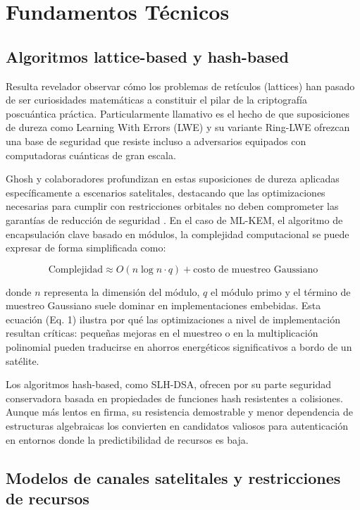 \section{Fundamentos Técnicos}

\subsection{Algoritmos lattice-based y hash-based}

Resulta revelador observar cómo los problemas de retículos (lattices) han pasado de ser curiosidades matemáticas a constituir el pilar de la criptografía poscuántica práctica. Particularmente llamativo es el hecho de que suposiciones de dureza como Learning With Errors (LWE) y su variante Ring-LWE ofrezcan una base de seguridad que resiste incluso a adversarios equipados con computadoras cuánticas de gran escala.

Ghosh y colaboradores profundizan en estas suposiciones de dureza aplicadas específicamente a escenarios satelitales, destacando que las optimizaciones necesarias para cumplir con restricciones orbitales no deben comprometer las garantías de reducción de seguridad \cite{Ghosh2026}. En el caso de ML-KEM, el algoritmo de encapsulación clave basado en módulos, la complejidad computacional se puede expresar de forma simplificada como:

\begin{equation}
\text{Complejidad} \approx O(n \log n \cdot q) + \text{costo de muestreo Gaussiano}
\label{eq:complejidad_mlkem}
\end{equation}

donde \(n\) representa la dimensión del módulo, \(q\) el módulo primo y el término de muestreo Gaussiano suele dominar en implementaciones embebidas. Esta ecuación (Eq. 1) ilustra por qué las optimizaciones a nivel de implementación resultan críticas: pequeñas mejoras en el muestreo o en la multiplicación polinomial pueden traducirse en ahorros energéticos significativos a bordo de un satélite.

Los algoritmos hash-based, como SLH-DSA, ofrecen por su parte seguridad conservadora basada en propiedades de funciones hash resistentes a colisiones. Aunque más lentos en firma, su resistencia demostrable y menor dependencia de estructuras algebraicas los convierten en candidatos valiosos para autenticación en entornos donde la predictibilidad de recursos es baja.

\subsection{Modelos de canales satelitales y restricciones de recursos}

